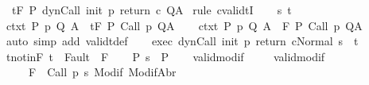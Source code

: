 \begin{isabellebody}
\ {\isachardoublequoteopen}{\isasymGamma}{\isacharcomma}{\isasymTheta}\ {\isasymTurnstile}\isactrlsub t\isactrlbsub {\isacharslash}F\isactrlesub \ P\ {\isacharparenleft}dynCall\ init\ p\ return\ c{\isacharparenright}\ Q{\isacharcomma}A{\isachardoublequoteclose}\isanewline
%
\isadelimproof
%
\endisadelimproof
%
\isatagproof
{}\isamarkupfalse%
\ {\isacharparenleft}rule\ cvalidtI{\isacharparenright}\isanewline
\ \ \isamarkupfalse%
\ s\ t\isanewline
\ \ \isamarkupfalse%
\ ctxt{\isacharcolon}\ {\isachardoublequoteopen}{\isasymforall}{\isacharparenleft}P{\isacharcomma}\ p{\isacharcomma}\ Q{\isacharcomma}\ A{\isacharparenright}{\isasymin}{\isasymTheta}{\isachardot}\ {\isasymGamma}\ {\isasymTurnstile}\isactrlsub t\isactrlbsub {\isacharslash}F\isactrlesub \ P\ {\isacharparenleft}Call\ p{\isacharparenright}\ Q{\isacharcomma}A{\isachardoublequoteclose}\isanewline
\ \ \isamarkupfalse%
\ ctxt{\isacharprime}{\isacharcolon}\ {\isachardoublequoteopen}{\isasymforall}{\isacharparenleft}P{\isacharcomma}\ p{\isacharcomma}\ Q{\isacharcomma}\ A{\isacharparenright}{\isasymin}{\isasymTheta}{\isachardot}\ {\isasymGamma}\ {\isasymTurnstile}\isactrlbsub {\isacharslash}F\isactrlesub \ P\ {\isacharparenleft}Call\ p{\isacharparenright}\ Q{\isacharcomma}A{\isachardoublequoteclose}\ \isanewline
\ \ \ \ \isamarkupfalse%
\ {\isacharparenleft}auto\ simp\ add{\isacharcolon}\ validt{\isacharunderscore}def{\isacharparenright}\isanewline
\ \ \isamarkupfalse%
\ exec{\isacharcolon}\ {\isachardoublequoteopen}{\isasymGamma}{\isasymturnstile}{\isasymlangle}dynCall\ init\ p\ return\ c{\isacharcomma}Normal\ s{\isasymrangle}\ {\isasymRightarrow}\ t{\isachardoublequoteclose}\isanewline
\ \ \isamarkupfalse%
\ t{\isacharunderscore}notin{\isacharunderscore}F{\isacharcolon}\ {\isachardoublequoteopen}t\ {\isasymnotin}\ Fault\ {\isacharbackquote}\ F{\isachardoublequoteclose}\isanewline
\ \ \isamarkupfalse%
\ P{\isacharcolon}\ {\isachardoublequoteopen}s\ {\isasymin}\ P{\isachardoublequoteclose}\isanewline
\ \ \isamarkupfalse%
\ valid{\isacharunderscore}modif\ \isanewline
\ \ \isamarkupfalse%
\ valid{\isacharunderscore}modif{\isacharprime}{\isacharcolon}\ \isanewline
\ \ \ \ {\isachardoublequoteopen}{\isasymforall}{\isasymsigma}{\isachardot}\ {\isasymGamma}{\isacharcomma}{\isasymTheta}{\isasymTurnstile}\isactrlbsub {\isacharslash}F\isactrlesub \ {\isacharbraceleft}{\isasymsigma}{\isacharbraceright}\ {\isacharparenleft}Call\ {\isacharparenleft}p\ s{\isacharparenright}{\isacharparenright}\ {\isacharparenleft}Modif\ {\isasymsigma}{\isacharparenright}{\isacharcomma}{\isacharparenleft}ModifAbr\ {\isasymsigma}{\isacharparenright}{\isachardoublequoteclose}\isanewline

\end{isabellebody}
